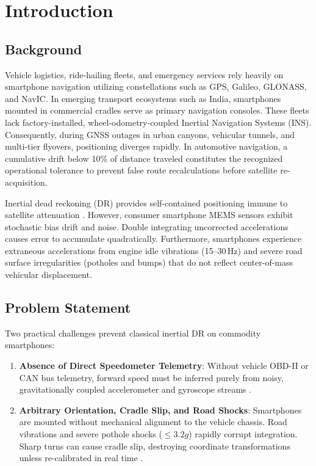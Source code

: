 \documentclass[conference]{IEEEtran}
\begin{document}
\section{Introduction}

\subsection{Background}
Vehicle logistics, ride-hailing fleets, and emergency services rely heavily on smartphone navigation utilizing constellations such as GPS, Galileo, GLONASS, and NavIC. In emerging transport ecosystems such as India, smartphones mounted in commercial cradles serve as primary navigation consoles. These fleets lack factory-installed, wheel-odometry-coupled Inertial Navigation Systems (INS). Consequently, during GNSS outages in urban canyons, vehicular tunnels, and multi-tier flyovers, positioning diverges rapidly. In automotive navigation, a cumulative drift below 10\% of distance traveled constitutes the recognized operational tolerance to prevent false route recalculations before satellite re-acquisition.

Inertial dead reckoning (DR) provides self-contained positioning immune to satellite attenuation \cite{brossard2020, lawal2024}. However, consumer smartphone MEMS sensors exhibit stochastic bias drift and noise. Double integrating uncorrected accelerations causes error to accumulate quadratically. Furthermore, smartphones experience extraneous accelerations from engine idle vibrations (15--30\,Hz) and severe road surface irregularities (potholes and bumps) that do not reflect center-of-mass vehicular displacement.

\subsection{Problem Statement}
Two practical challenges prevent classical inertial DR on commodity smartphones:
\begin{enumerate}
\item \textbf{Absence of Direct Speedometer Telemetry}: Without vehicle OBD-II or CAN bus telemetry, forward speed must be inferred purely from noisy, gravitationally coupled accelerometer and gyroscope streams \cite{brossard2020, qian2025}.
\item \textbf{Arbitrary Orientation, Cradle Slip, and Road Shocks}: Smartphones are mounted without mechanical alignment to the vehicle chassis. Road vibrations and severe pothole shocks ($\le 3.2g$) rapidly corrupt integration. Sharp turns can cause cradle slip, destroying coordinate transformations unless re-calibrated in real time \cite{matos2025}.
\end{enumerate}
\end{document}
